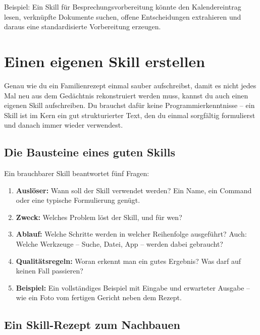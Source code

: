 Beispiel: Ein Skill für Besprechungsvorbereitung könnte den Kalendereintrag lesen, verknüpfte Dokumente suchen, offene Entscheidungen extrahieren und daraus eine standardisierte Vorbereitung erzeugen.

\section{Einen eigenen Skill erstellen}

Genau wie du ein Familienrezept einmal sauber aufschreibst, damit es nicht jedes Mal neu aus dem Gedächtnis rekonstruiert werden muss, kannst du auch einen eigenen Skill aufschreiben. Du brauchst dafür keine Programmierkenntnisse -- ein Skill ist im Kern ein gut strukturierter Text, den du einmal sorgfältig formulierst und danach immer wieder verwendest.

\subsection{Die Bausteine eines guten Skills}

Ein brauchbarer Skill beantwortet fünf Fragen:

\begin{enumerate}
\item \textbf{Auslöser:} Wann soll der Skill verwendet werden? Ein Name, ein Command oder eine typische Formulierung genügt.
\item \textbf{Zweck:} Welches Problem löst der Skill, und für wen?
\item \textbf{Ablauf:} Welche Schritte werden in welcher Reihenfolge ausgeführt? Auch: Welche Werkzeuge -- Suche, Datei, App -- werden dabei gebraucht?
\item \textbf{Qualitätsregeln:} Woran erkennt man ein gutes Ergebnis? Was darf auf keinen Fall passieren?
\item \textbf{Beispiel:} Ein vollständiges Beispiel mit Eingabe und erwarteter Ausgabe -- wie ein Foto vom fertigen Gericht neben dem Rezept.
\end{enumerate}

\subsection{Ein Skill-Rezept zum Nachbauen}

